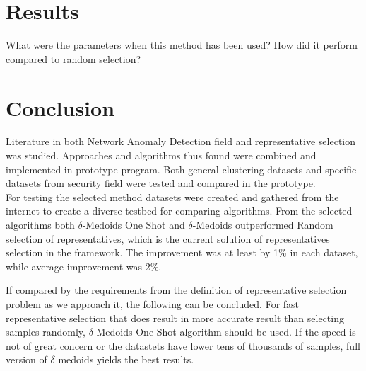 \documentclass[thesis=B,english]{FITthesis}[2012/10/20]
\begin{document}

\chapter{Results}

What were the parameters when this method has been used?
How did it perform compared to random selection?




\chapter{Conclusion}
Literature in both Network Anomaly Detection field and representative selection was studied.
Approaches and algorithms thus found were combined and implemented in prototype program.
Both general clustering datasets and specific datasets from security field were tested and compared in the prototype. \\

For testing the selected method datasets were created and gathered from the internet to create a diverse testbed for comparing algorithms.
From the selected algorithms both $\delta$-Medoids One Shot and $\delta$-Medoids outperformed Random selection of representatives, which is the current solution of representatives selection in the framework.
The improvement was at least by 1\% in each dataset, while average improvement was 2\%.  \\


If compared by the requirements from the definition of representative selection problem as we approach it, the following can be concluded.
For fast representative selection that does result in more accurate result than selecting samples randomly, $\delta$-Medoids One Shot algorithm should be used.
If the speed is not of great concern or the datastets have lower tens of thousands of samples, full version of $\delta$ medoids yields the best results.




\appendix
\end{document}
